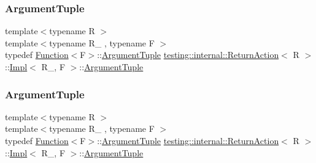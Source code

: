 \subsubsection{\texorpdfstring{ArgumentTuple}{ArgumentTuple}\hspace{0.1cm}{\footnotesize\ttfamily [2/3]}}
{\footnotesize\ttfamily template$<$typename R $>$ \\
template$<$typename R\+\_\+ , typename F $>$ \\
typedef \mbox{\hyperlink{structtesting_1_1internal_1_1_function}{Function}}$<$F$>$\+::\mbox{\hyperlink{classtesting_1_1_action_interface_af72720d864da4d606629e83edc003511}{Argument\+Tuple}} \mbox{\hyperlink{classtesting_1_1internal_1_1_return_action}{testing\+::internal\+::\+Return\+Action}}$<$ R $>$\+::\mbox{\hyperlink{classtesting_1_1internal_1_1_return_action_1_1_impl}{Impl}}$<$ R\+\_\+, F $>$\+::\mbox{\hyperlink{classtesting_1_1_action_interface_af72720d864da4d606629e83edc003511}{Argument\+Tuple}}}

\mbox{\label{classtesting_1_1internal_1_1_return_action_1_1_impl_ae6311cbcb9aefd71304a7e40b24be62b}} 
\subsubsection{\texorpdfstring{ArgumentTuple}{ArgumentTuple}\hspace{0.1cm}{\footnotesize\ttfamily [3/3]}}
{\footnotesize\ttfamily template$<$typename R $>$ \\
template$<$typename R\+\_\+ , typename F $>$ \\
typedef \mbox{\hyperlink{structtesting_1_1internal_1_1_function}{Function}}$<$F$>$\+::\mbox{\hyperlink{classtesting_1_1_action_interface_af72720d864da4d606629e83edc003511}{Argument\+Tuple}} \mbox{\hyperlink{classtesting_1_1internal_1_1_return_action}{testing\+::internal\+::\+Return\+Action}}$<$ R $>$\+::\mbox{\hyperlink{classtesting_1_1internal_1_1_return_action_1_1_impl}{Impl}}$<$ R\+\_\+, F $>$\+::\mbox{\hyperlink{classtesting_1_1_action_interface_af72720d864da4d606629e83edc003511}{Argument\+Tuple}}}

\mbox{\label{classtesting_1_1internal_1_1_return_action_1_1_impl_a681fdf18258f86ea31efe0c55217e571}} 
